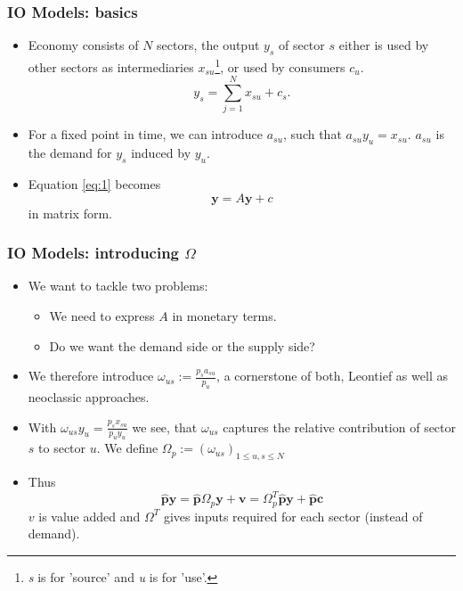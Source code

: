 \documentclass[utf8,aspectratio=169,ngerman,english]{beamer}
\newcommand{\hbf}[1]{\hat {\mathbf #1}}
\begin{document}
\begin{frame}
\frametitle{IO Models: basics}
\begin{itemize}
  \item Economy consists of $N$ sectors, the output $y_s$ of sector $s$ either is used by other sectors as intermediaries $x_{su}$\footnote{\textit{s} is for 'source' and \textit{u} is for 'use'.}, or used by consumers $c_u$.
    \begin{equation}
      y_s = \sum_{j=1}^N x_{s u} + c_{s}. 
      \label{eq:1}
    \end{equation}
  \item For a fixed point in time, we can introduce $a_{su}$, such that $a_{su} y_u = x_{su}.$ $a_{su}$ is the demand for $y_s$ induced by $y_u$. 
  \item Equation \eqref{eq:1} becomes
     \begin{equation}
       \mathbf y  = A \mathbf y + c
     \end{equation}
     in matrix form.
 \end{itemize} 
\end{frame}

\begin{frame}
  \frametitle{IO Models: introducing $\Omega$}
  \begin{itemize}
    \item We want to tackle two problems:
      \begin{itemize}
        \item We need to express $A$ in monetary terms.    
        \item Do we want the demand side or the supply side?
      \end{itemize}
    \item We therefore introduce $\omega_{us} := \frac{p_s a_{su}}{p_u}$, a cornerstone of both, Leontief as well as neoclassic approaches.
    \item With $\omega_{us} y_u = \frac{p_s x_{su}}{p_u y_u}$ we see, that $\omega_{us}$ captures the relative contribution of sector $s$ to sector $u$. We define $\Omega_p := (\omega_{us})_{1 \leq u,s \leq N}$
    \item Thus    
      $$ \hbf{p} \mathbf{y}  = \hbf p \Omega_p \mathbf{y} + \mathbf{v} = \Omega_p^T \hbf{p}  \mathbf{y} + \hbf{p} \mathbf{c}$$
 $v$ is value added and $\Omega^T$ gives inputs required for each sector (instead of demand).
  \end{itemize}
\end{frame}
\end{document}
